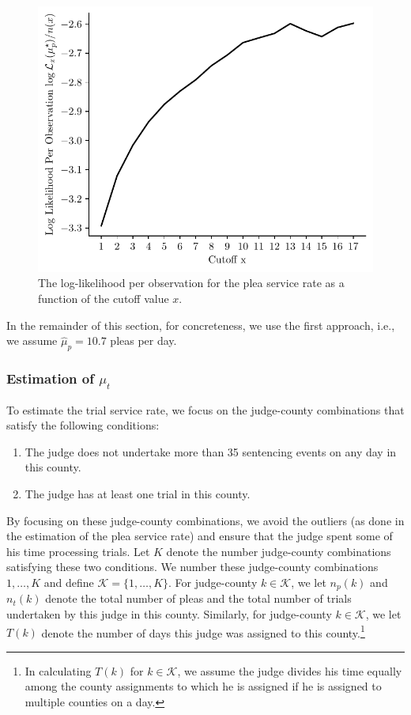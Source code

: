 \documentclass[11pt, oneside]{article}   	%
\theoremstyle{ModifiedStyle}
\begin{document}
\begin{figure}[H]
	\centering
	\includegraphics[scale=0.75]{Figures/Log_Likelihood_Per_Observation_Top}
	\caption{The log-likelihood per observation for the plea service rate as a function of the cutoff value $x$.}
	\vspace{-2mm}
	\label{Figure_Plea_Service_Rate_Log_Likelihood_Per_Observation}
\end{figure}
%
In the remainder of this section, for concreteness, we use the first approach, i.e., we assume $\hat{\mu}_p = 10.7$ pleas per day.

\subsubsection{Estimation of $\mu_t$}
To estimate the trial service rate, we focus on the judge-county combinations that satisfy the following conditions:
\begin{enumerate}[label=(\roman*)]
	\vspace{-2mm}
	\item The judge does not undertake more than 35 sentencing events on any day in this county.
	\item The judge has at least one trial in this county. 
\end{enumerate}
\vspace{-1mm}
By focusing on these judge-county combinations, we avoid the outliers (as done in the estimation of the plea service rate) and ensure that the judge spent some of his time processing trials. Let $K$ denote the number judge-county combinations satisfying these two conditions. We number these judge-county combinations $1,\ldots,K$ and define $\mathcal{K} = \{1,\ldots,K\}$. For judge-county $k \in \mathcal{K}$, we let $n_p(k)$ and $n_t(k)$ denote the total number of pleas and the total number of trials undertaken by this judge in this county. Similarly, for judge-county $k \in \mathcal{K}$, we let $T(k)$ denote the number of days this judge was assigned to this county.\footnote{In calculating $T(k)$ for $k\in\mathcal{K}$, we assume the judge divides his time equally among the county assignments to which he is assigned if he is assigned to multiple counties on a day.}
\end{document}

